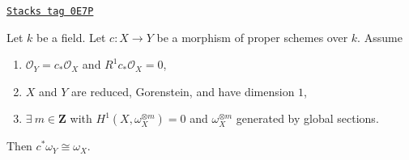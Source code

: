 \begin{lemma}
\label{curves-lemma-contract-gorenstein-canonical}
\href{https://stacks.math.columbia.edu/tag/0E7P}{\texttt{Stacks tag 0E7P}}

Let $k$ be a field. Let $c : X \to Y$ be a morphism of proper schemes over $k$.
Assume
\begin{enumerate}
\item $\mathcal{O}_Y = c_*\mathcal{O}_X$ and $R^1c_*\mathcal{O}_X = 0$,
\item $X$ and $Y$ are reduced, Gorenstein, and have dimension $1$,
\item $\exists\ m \in \mathbf{Z}$ with
$H^1(X, \omega_X^{\otimes m}) = 0$ and $\omega_X^{\otimes m}$
generated by global sections.
\end{enumerate}
Then $c^*\omega_Y \cong \omega_X$.
\end{lemma}

